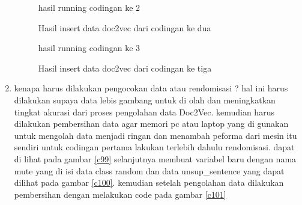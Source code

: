 \begin{enumerate}
\begin{figure}[!htbp]
      \caption{hasil running codingan ke 2}
      \label{c95}
      \end{figure}

\begin{figure}[!htbp]
      \caption{Hasil insert data doc2vec dari codingan ke dua}
      \label{c96}
      \end{figure}

\begin{figure}[!htbp]
      \caption{hasil running codingan ke 3}
      \label{c97}
      \end{figure}

\begin{figure}[!htbp]
      \caption{Hasil insert data doc2vec dari codingan ke tiga}
      \label{c98}
      \end{figure}

\item kenapa harus dilakukan pengocokan data atau rendomisasi ? hal ini harus dilakukan supaya data lebis gambang untuk di olah dan meningkatkan tingkat akurasi dari proses pengolahan data Doc2Vec. kemudian harus dilakukan pembersihan data agar memori pc atau laptop yang di gunakan untuk mengolah data menjadi ringan dan menambah peforma dari mesin itu sendiri untuk codingan pertama lakukan terlebih dahulu rendomisasi. dapat di lihat pada gambar \ref{c99} selanjutnya membuat variabel baru dengan nama mute yang di isi data class random dan data unsup\_sentence yang dapat dilihat pada gambar \ref{c100}. kemudian setelah pengolahan data dilakukan pembersihan dengan melakukan code pada gambar \ref{c101}


\end{enumerate}

